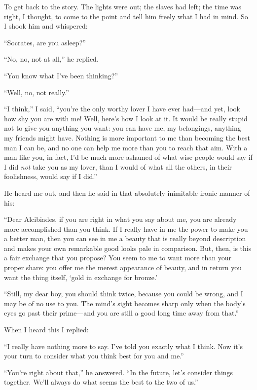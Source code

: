  To get back to the story. The lights were out; the slaves had
left; the time was right, I thought, to come to the point and tell him
freely what I had in mind. So I shook him and whispered:

“Socrates, are you asleep?”

“No, no, not at all,” he replied.

“You know what I've been thinking?”

“Well, no, not really.”

“I think,” I said, “you're the only worthy lover I have ever had---and
yet, look how shy you are with me! Well, here's how I look at it. It
would  be really stupid not to give you anything you want: you
can have me, my belongings, anything my friends might have. Nothing is
more important to me than becoming the best man I can be, and no one can
help me more than you to reach that aim. With a man like you, in fact,
I'd be much more ashamed of what wise people would say if I did
{\em not} take you as my lover, than I would of what all the others, in
their foolishness, would say if I did.”

He heard me out, and then he said in that absolutely inimitable ironic
manner of his:

 “Dear Alcibiades, if you are right in what you say about me, you
are already more accomplished than you think. If I really have in me the
power to make you a better man, then you can see in me a beauty that is
really beyond description and makes your own remarkable good looks pale
in comparison. But, then, is this a fair exchange that you propose? You
seem to me to want more than your proper share: you offer me the merest
appearance of beauty, and in return you want the thing itself, ‘gold
 in exchange for
bronze.'

“Still, my dear boy, you should think twice, because you could be wrong,
and I may be of no use to you. The mind's sight becomes sharp only when
the body's eyes go past their prime---and you are still a good long time
away from that.”

When I heard this I replied:

“I really have nothing more to say. I've told you exactly what I think.
Now it's your turn to consider what you think best for you and me.”

 “You're right about that,” he answered. “In the future, let's
consider things together. We'll always do what seems the best to the two
of us.”

